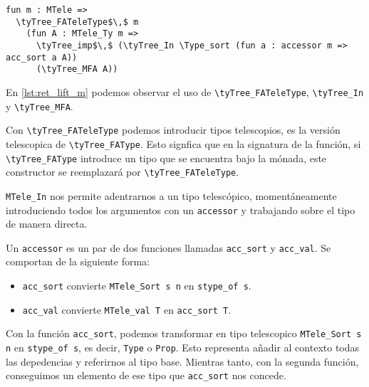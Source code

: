 \begin{lstlisting}[frame=tb,caption={\lstinline{ret} lifteado},label=lst:ret_lift_m]
fun m : MTele =>
  \tyTree_FATeleType$\,$ m
    (fun A : MTele_Ty m =>
      \tyTree_imp$\,$ (\tyTree_In \Type_sort (fun a : accessor m => acc_sort a A))
      (\tyTree_MFA A))
\end{lstlisting}

En \ref{lst:ret_lift_m} podemos observar el uso de \lstinline{\tyTree_FATeleType}, \lstinline{\tyTree_In} y \lstinline{\tyTree_MFA}.

Con \lstinline{\tyTree_FATeleType} podemos introducir tipos telescopios, es la versión telescopica de \lstinline{\tyTree_FAType}. Esto signfica que en la signatura de la función, si \lstinline{\tyTree_FAType} introduce un tipo que se encuentra bajo la mónada, este constructor se reemplazará por \lstinline{\tyTree_FATeleType}.

\lstinline{MTele_In} nos permite adentrarnos a un tipo telescópico, momentáneamente introduciendo todos los argumentos con un \lstinline{accessor} y trabajando sobre el tipo de manera directa.

Un \lstinline{accessor} es un par de dos funciones llamadas \lstinline{acc_sort} y \lstinline{acc_val}.
Se comportan de la siguiente forma:
\begin{itemize}
  \item \lstinline{acc_sort} convierte \lstinline{MTele_Sort s n} en \lstinline{stype_of s}.
  \item \lstinline{acc_val} convierte \lstinline{MTele_val T} en \lstinline{acc_sort T}.
\end{itemize}

Con la función \lstinline{acc_sort}, podemos transformar en tipo telescopico \lstinline{MTele_Sort s n} en \lstinline{stype_of s}, es decir, \lstinline{Type} o \lstinline{Prop}. Esto representa añadir al contexto todas las depedencias y referirnos al tipo base. Mientras tanto, con la segunda función, conseguimos un elemento de ese tipo que \lstinline{acc_sort} nos concede.


